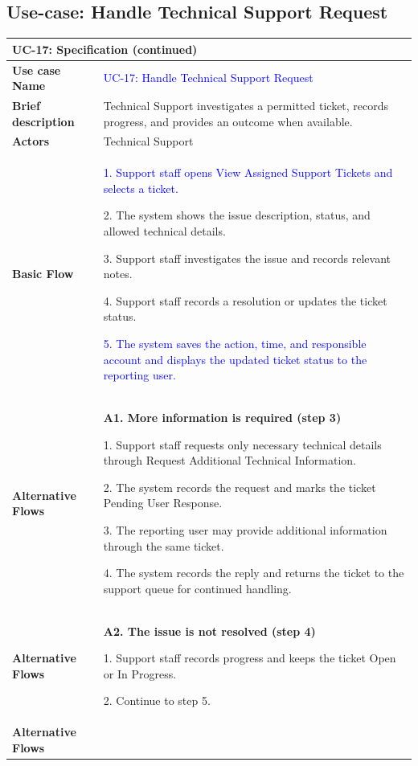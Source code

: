 \subsection{Use-case: Handle Technical Support Request}
\label{uc:uc-17}
\begin{longtable}{|p{}|p{}|}
\hline
\endfirsthead
\multicolumn{2}{l}{\textbf{UC-17: Specification (continued)}}\\
\hline
\endhead
\textbf{Use case Name} &
\textcolor{blue}{UC-17: Handle Technical Support Request}
\\ \hline
\textbf{Brief description} &
Technical Support investigates a permitted ticket, records progress, and provides an outcome when available.
\\ \hline
\textbf{Actors} & Technical Support \\ \hline
\textbf{Basic Flow} &
\textcolor{blue}{1. Support staff opens View Assigned Support Tickets and selects a ticket.}\par
2. The system shows the issue description, status, and allowed technical details.\par
3. Support staff investigates the issue and records relevant notes.\par
4. Support staff records a resolution or updates the ticket status.\par
\textcolor{blue}{5. The system saves the action, time, and responsible account and displays the updated ticket status to the reporting user.}
\\ \hline
\textbf{Alternative Flows} &
\textbf{A1. More information is required (step 3)}\par
1. Support staff requests only necessary technical details through Request Additional Technical Information.\par
2. The system records the request and marks the ticket Pending User Response.\par
3. The reporting user may provide additional information through the same ticket.\par
4. The system records the reply and returns the ticket to the support queue for continued handling.
\\ \hline
\textbf{Alternative Flows} &
\textbf{A2. The issue is not resolved (step 4)}\par
1. Support staff records progress and keeps the ticket Open or In Progress.\par
2. Continue to step 5.
\\ \hline
\textbf{Alternative Flows} &

\end{longtable}

